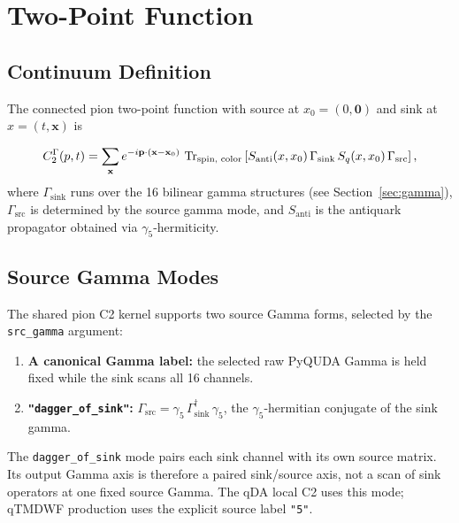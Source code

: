 \documentclass[11pt]{article}
\begin{document}
\section{Two-Point Function}

\subsection{Continuum Definition}

The connected pion two-point function with source at $x_0 = (0, \mathbf{0})$ and sink at $x = (t, \mathbf{x})$ is

\begin{equation}
    C_2^{\Gamma}(p, t) = \sum_{\mathbf{x}} e^{-i \mathbf{p} \cdot (\mathbf{x} - \mathbf{x}_0)} \,
    \Tr_{\text{spin, color}} \left[ S_{\text{anti}}(x, x_0) \, \Gamma_{\text{sink}} \, S_q(x, x_0) \, \Gamma_{\text{src}} \right],
\end{equation}
where $\Gamma_{\text{sink}}$ runs over the 16 bilinear gamma structures (see Section~\ref{sec:gamma}), $\Gamma_{\text{src}}$ is determined by the source gamma mode, and $S_{\text{anti}}$ is the antiquark propagator obtained via $\gamma_5$-hermiticity.

\subsection{Source Gamma Modes}

The shared pion C2 kernel supports two source Gamma forms, selected by the
\texttt{src\_gamma} argument:

\begin{enumerate}
    \item \textbf{A canonical Gamma label:} the selected raw PyQUDA Gamma is
    held fixed while the sink scans all 16 channels.
    \item \textbf{\texttt{"dagger\_of\_sink"}:} $\Gamma_{\text{src}} = \gamma_5 \, \Gamma_{\text{sink}}^\dagger \, \gamma_5$, the $\gamma_5$-hermitian conjugate of the sink gamma.
\end{enumerate}

The \texttt{dagger\_of\_sink} mode pairs each sink channel with its own source
matrix.  Its output Gamma axis is therefore a paired sink/source axis, not a
scan of sink operators at one fixed source Gamma.  The qDA local C2 uses this
mode; qTMDWF production uses the explicit source label \texttt{"5"}.
\end{document}
